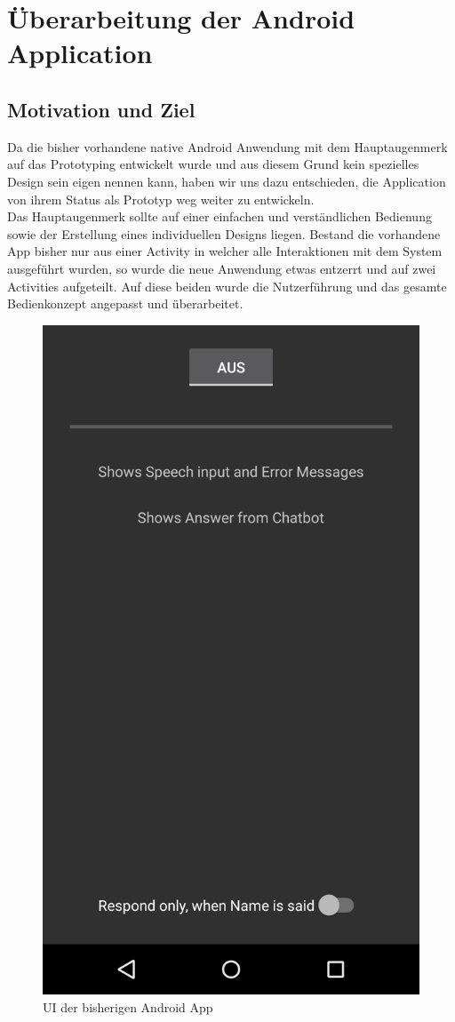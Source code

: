 \section{Überarbeitung der Android Application}

	\subsection{Motivation und Ziel}\label{motiv}
	Da die bisher vorhandene native Android Anwendung mit dem Hauptaugenmerk auf das Prototyping entwickelt wurde und aus diesem Grund kein spezielles Design sein eigen nennen kann, haben wir uns dazu entschieden, die Application von ihrem Status als Prototyp weg weiter zu entwickeln.\\
	Das Hauptaugenmerk sollte auf einer einfachen und verständlichen Bedienung sowie der Erstellung eines individuellen Designs liegen. Bestand die vorhandene App bisher nur aus einer Activity in welcher alle Interaktionen mit dem System ausgeführt wurden, so wurde die neue Anwendung etwas entzerrt und auf zwei Activities aufgeteilt. Auf diese beiden wurde die Nutzerführung und das gesamte Bedienkonzept angepasst und überarbeitet.\\

	\begin{figure}[htbp]
		\centering
		\includegraphics[height=0.8\textwidth]{dh/graphics/hablame-old.png}
		\caption{UI der bisherigen Android App}
		\label{fig:hablame-old}
	\end{figure} \leavevmode \\

